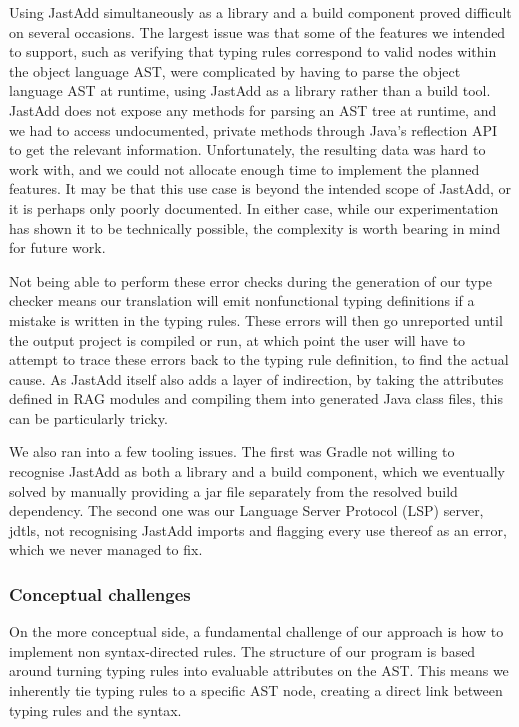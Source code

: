 \documentclass[nofilelist]{cslthse-msc}
\newcommand{\CR}[1]{\textcolor{green!60!black}{[\textbf{CR}:#1]}}
\begin{document}
Using JastAdd simultaneously as a library and a build component proved difficult on several occasions.
The largest issue was that some of the features we intended to support, such as verifying that typing rules correspond to valid nodes within the object language AST, were complicated by having to parse the object language AST at runtime, using JastAdd as a library rather than a build tool.
JastAdd does not expose any methods for parsing an AST tree at runtime, and we had to access undocumented, private methods through Java's reflection API to get the relevant information.
Unfortunately, the resulting data was hard to work with, and we could not allocate enough time to implement the planned features.
It may be that this use case is beyond the intended scope of JastAdd, or it is perhaps only poorly documented.
In either case, while our experimentation has shown it to be technically possible, the complexity is worth bearing in mind for future work.

Not being able to perform these error checks during the generation of our type checker means our translation will emit nonfunctional typing definitions if a mistake is written in the typing rules.
These errors will then go unreported until the output project is compiled or run, at which point the user will have to attempt to trace these errors back to the typing rule definition, to find the actual cause.
As JastAdd itself also adds a layer of indirection, by taking the attributes defined in RAG modules and compiling them into generated Java class files, this can be particularly tricky.

We also ran into a few tooling issues.
The first was Gradle not willing to recognise JastAdd as both a library and a build component, which we eventually solved by manually providing a jar file separately from the resolved build dependency.
The second one was our Language Server Protocol (LSP) server, jdtls, not recognising JastAdd imports and flagging every use thereof as an error, which we never managed to fix.


\subsubsection{Conceptual challenges}
On the more conceptual side, a fundamental challenge of our approach is how to implement non syntax-directed rules.
The structure of our program is based around turning typing rules into evaluable attributes on the AST.
This means we inherently tie typing rules to a specific AST node, creating a direct link between typing rules and the syntax.
\end{document}
